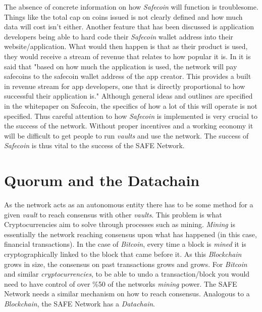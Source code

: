 The absence of concrete information on how \textit{Safecoin} will function is troublesome. Things like the total cap on coins issued is not clearly defined and how much data will cost isn't either. Another feature that has been discussed is application developers being able to hard code their \textit{Safecoin} wallet address into their website/application. What would then happen is that as their product is used, they would receive a stream of revenue that relates to how popular it is. In \cite{lambert2015safecoin} it is said that "based on how much the application is used, the network will pay safecoins to the safecoin wallet address of the app creator. This provides a built in revenue stream for app developers, one that is directly proportional to how successful their application is." Although general ideas and outlines are specified in the whitepaper on Safecoin, the specifics of how a lot of this will operate is not specified. Thus careful attention to how \textit{Safecoin} is implemented is very crucial to the success of the network. Without proper incentives and a working economy it will be difficult to get people to run \textit{vaults} and use the network. The success of \textit{Safecoin} is thus vital to the success of the SAFE Network.

\section{Quorum and the Datachain}
\label{sec:datachain}

As the network acts as an autonomous entity there has to be some method for a given \textit{vault} to reach consensus with other \textit{vaults}. This problem is what Cryptocurrencies aim to solve through processes such as mining. \textit{Mining} is essentially the network reaching consensus upon what has happened (in this case, financial transactions). In the case of \textit{Bitcoin}, every time a block is \textit{mined} it is cryptographically linked to the block that came before it. As this \textit{Blockchain} grows in size, the consensus on past transactions grows and grows. For \textit{Bitcoin} and similar \textit{cryptocurrencies}, to be able to undo a transaction/block you would need to have control of over \%50 of the networks \textit{mining} power. The SAFE Network needs a similar mechanism on how to reach consensus. Analogous to a \textit{Blockchain}, the SAFE Network has a \textit{Datachain}. 


